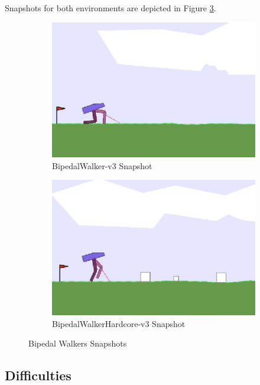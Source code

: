 \documentclass[a4paper, 12pt]{article} %
\begin{document}
Snapshots for both environments are depicted in Figure \ref{fig:bipedal_walkers}.

\begin{figure}
	\begin{subfigure}{.5\textwidth}
		\centering
		\includegraphics[width=0.9\linewidth]{figures/bipedal/classic.png}
		\caption{BipedalWalker-v3 Snapshot~\cite{noauthor_bipedalwalker-v2_2021}}
		\label{fig:bipedal_walker_classic}
	\end{subfigure}
	\begin{subfigure}{.5\textwidth}
		\centering
		\includegraphics[width=0.9\linewidth]{figures/bipedal/hardcore.png}
		\caption{BipedalWalkerHardcore-v3 Snapshot~\cite{noauthor_bipedalwalkerhardcore-v2_2021}}
		\label{fig:bipedal_walker_hardcore}
	\end{subfigure}
	\caption{Bipedal Walkers Snapshots}
	\label{fig:bipedal_walkers}
\end{figure}

\subsection{Difficulties}
\end{document}
